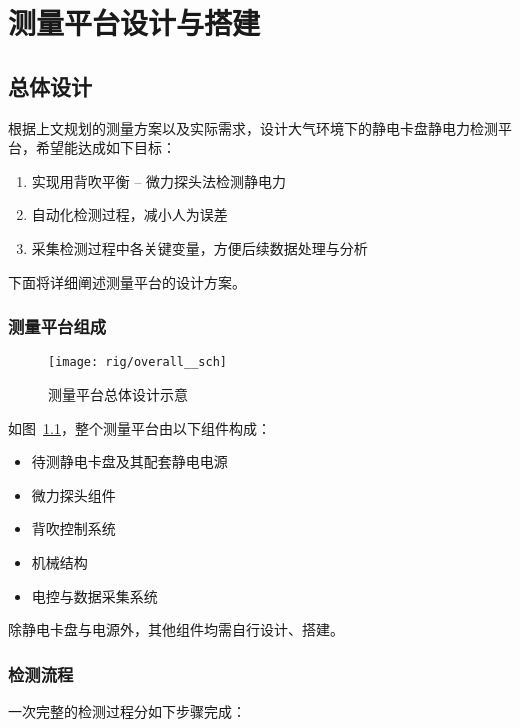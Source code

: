 \chapter{测量平台设计与搭建}



\section{总体设计}\label{sec:rig-overall}

根据上文规划的测量方案以及实际需求，设计大气环境下的静电卡盘静电力检测平台，希望能达成如下目标：

\begin{enumerate}
  \item 实现用背吹平衡 -- 微力探头法检测静电力
  \item 自动化检测过程，减小人为误差
  \item 采集检测过程中各关键变量，方便后续数据处理与分析
\end{enumerate}

下面将详细阐述测量平台的设计方案。


\subsection{测量平台组成}\label{sec:rig-overall-comp}

\begin{figure}[tbh]
\centering
\texttt{[image: rig/overall\_\_sch]}
\caption{测量平台总体设计示意}
\label{fig:rig-overall-sch}
\end{figure}

如图~\ref{fig:rig-overall-sch}，整个测量平台由以下组件构成：

\begin{itemize}
  \item 待测静电卡盘及其配套静电电源
  \item 微力探头组件
  \item 背吹控制系统
  \item 机械结构
  \item 电控与数据采集系统
\end{itemize}

除静电卡盘与电源外，其他组件均需自行设计、搭建。


\subsection{检测流程}

一次完整的检测过程分如下步骤完成：


